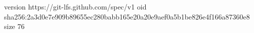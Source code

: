 version https://git-lfs.github.com/spec/v1
oid sha256:2a3d0e7e909b89655ec280babb165e20a20e9aef0a5b1be826e4f166a87360e8
size 76
